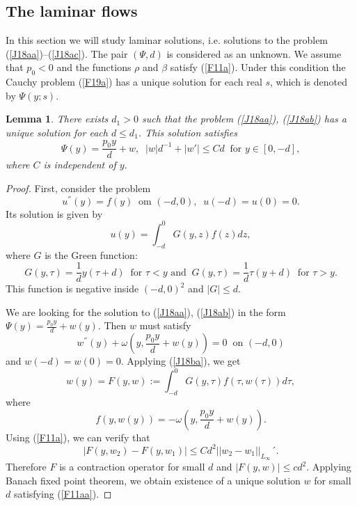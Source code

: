 \documentclass[a4paper,reqno,12pt]{amsart}
\theoremstyle{plain}
\newtheorem{lemma}[theorem]{Lemma}
\theoremstyle{definition}
\numberwithin{equation}{section}
\begin{document}
\subsection{The laminar flows}

In this section we will study laminar solutions, i.e. solutions to the problem (\ref{J18aa})--(\ref{J18ac}). %
The pair $(\Psi,d)$ is considered as an unknown.
We assume that $p_0<0$ and the functions $\rho$ and $\beta$ satisfy (\ref{F11a}).
Under this condition the Cauchy problem (\ref{F19a})
has a unique solution for each real $s$, which is denoted by $\Psi(y;s)$.



\begin{lemma}\label{LemF11a} There exists $d_1>0$ such that the problem (\ref{J18aa}), (\ref{J18ab})
has a unique solution for each $d\leq d_1$. This solution satisfies
\begin{equation}\label{F11aa}
\Psi(y)=\frac{p_0y}{d}+w,\;\;|w|d^{-1}+|w'|\leq Cd\;\;\mbox{for $y\in [0,-d]$},
\end{equation}
where $C$ is independent of $y$.

\end{lemma}
\begin{proof} First, consider  the problem
\begin{equation}\label{J18b}
u^{''}(y)=f(y)\;\;\mbox{om $(-d,0)$}, \;\;u(-d)=u(0)=0.
\end{equation}
Its solution is given by
\begin{equation}\label{J18ba}
u(y)=\int_{-d}^0G(y,z)f(z)dz,
\end{equation}
where $G$ is the Green function:
$$
G(y,\tau)=\frac{1}{d}y(\tau+d)\;\;\mbox{for $\tau<y$ and}\;\;G(y,\tau)=\frac{1}{d}\tau(y+d)\;\;\mbox{for $\tau>y$}.
$$
This function is negative inside $(-d,0)^2$ and $|G|\leq d$.

We are looking for the solution to  (\ref{J18aa}), (\ref{J18ab}) in the form
$\Psi(y)=\frac{p_0y}{d}+w(y)$.
Then $w$ must satisfy
$$
w^{''}(y)+\omega(y,\frac{p_0y}{d}+w(y))=0\;\;\mbox{on $(-d,0)$}
$$
and $w(-d)=w(0)=0$. Applying (\ref{J18ba}), we get
$$
w(y)=F(y,w):=\int_{-d}^0G(y,\tau)f(\tau,w(\tau))d\tau,
$$
where
$$
f(y,w(y))=-\omega(y,\frac{p_0y}{d}+w(y)).
$$
Using (\ref{F11a}), we can verify that
$$
|F(y,w_2)-F(y,w_1)|\leq Cd^2||w_2-w_1||_{L_\infty}´.
$$
Therefore $F$ is a contraction operator for small $d$ and $|F(y,w)|\leq cd^2$.
Applying Banach fixed point theorem, we obtain existence of a unique solution $w$ for small $d$ satisfying (\ref{F11aa}).



\end{proof}
\end{document}
